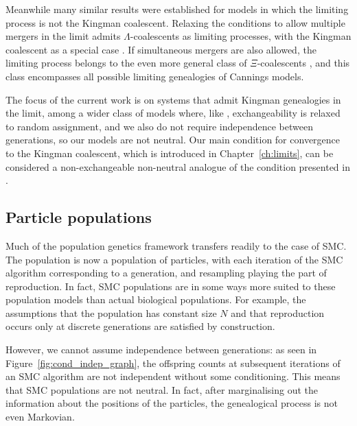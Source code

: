 Meanwhile many similar results were established for models in which the limiting process is not the Kingman coalescent.
Relaxing the conditions to allow multiple mergers in the limit admits $\Lambda$-coalescents as limiting processes, with the Kingman coalescent as a special case \parencite{pitman1999, sagitov1999, mohlesagitov1998}.
If simultaneous mergers are also allowed, the limiting process belongs to the even more general class of $\Xi$-coalescents \parencite{mohle2001}, and this class encompasses all possible limiting genealogies of Cannings models.

The focus of the current work is on systems that admit Kingman genealogies in the limit, among a wider class of models where, like \textcite{mohle1998, mohle1999}, exchangeability is relaxed to random assignment, and we also do not require independence between generations, so our models are not neutral. 
Our main condition for convergence to the Kingman coalescent, which is introduced in Chapter~\ref{ch:limits}, can be considered a non-exchangeable non-neutral analogue of the condition presented in \textcite{mohle2000}.




\subsection{Particle populations}
Much of the population genetics framework transfers readily to the case of SMC. The population is now a population of particles, with each iteration of the SMC algorithm corresponding to a generation, and resampling playing the part of reproduction.
In fact, SMC populations are in some ways more suited to these population models than actual biological populations.
For example, the assumptions that the population has constant size $N$ and that reproduction occurs only at discrete generations are satisfied by construction.

However, we cannot assume independence between generations: as seen in Figure~\ref{fig:cond_indep_graph}, the offspring counts at subsequent iterations of an SMC algorithm are not independent without some conditioning. 
This means that SMC populations are not neutral.
In fact, after marginalising out the information about the positions of the particles, the genealogical process is not even Markovian.





